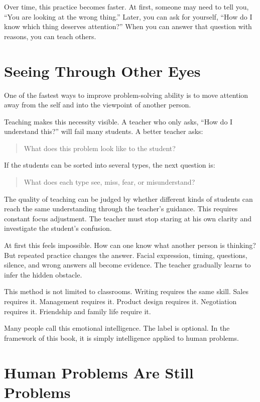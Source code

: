 Over time, this practice becomes faster. At first, someone may need to tell you, ``You are looking at the wrong thing.'' Later, you can ask for yourself, ``How do I know which thing deserves attention?'' When you can answer that question with reasons, you can teach others.

\section*{Seeing Through Other Eyes}

One of the fastest ways to improve problem-solving ability is to move attention away from the self and into the viewpoint of another person.

Teaching makes this necessity visible. A teacher who only asks, ``How do I understand this?'' will fail many students. A better teacher asks:

\begin{quote}
What does this problem look like to the student?
\end{quote}

If the students can be sorted into several types, the next question is:

\begin{quote}
What does each type see, miss, fear, or misunderstand?
\end{quote}

The quality of teaching can be judged by whether different kinds of students can reach the same understanding through the teacher's guidance. This requires constant focus adjustment. The teacher must stop staring at his own clarity and investigate the student's confusion.

At first this feels impossible. How can one know what another person is thinking? But repeated practice changes the answer. Facial expression, timing, questions, silence, and wrong answers all become evidence. The teacher gradually learns to infer the hidden obstacle.

This method is not limited to classrooms. Writing requires the same skill. Sales requires it. Management requires it. Product design requires it. Negotiation requires it. Friendship and family life require it.

Many people call this emotional intelligence. The label is optional. In the framework of this book, it is simply intelligence applied to human problems.

\section*{Human Problems Are Still Problems}

